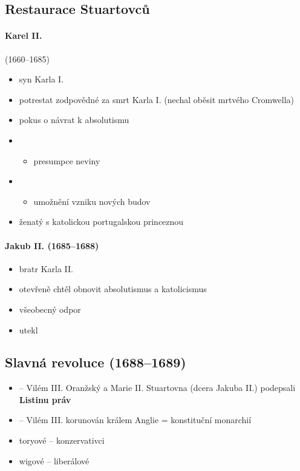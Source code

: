 \subsection{Restaurace Stuartovců}
\paragraph{Karel II.}(1660--1685)
\begin{itemize}
\item syn Karla I.
\item potrestat zodpovědné za smrt Karla I. (nechal oběsit mrtvého Cromwella)
\item pokus o návrat k absolutismu
\item {}
	\begin{itemize}
	\item presumpce neviny
	\end{itemize}
\item {}
	\begin{itemize}
	\item umožnění vzniku nových budov
	\end{itemize}
\item ženatý s katolickou portugalskou princeznou
\end{itemize}

\paragraph{Jakub II. (1685--1688)}
\begin{itemize}
\item bratr Karla II.
\item otevřeně chtěl obnovit absolutismus a katolicismus
\item[\ra] všeobecný odpor
\item utekl
\end{itemize}

\subsection{Slavná revoluce (1688--1689)}
\begin{itemize}
\item {} -- Vilém III. Oranžský a Marie II. Stuartovna (dcera Jakuba II.) podepsali \textbf{Listinu práv}
\item {} -- Vilém III. korunován králem \ra Anglie = konstituční monarchií
\item toryové -- konzervativci
\item wigové -- liberálové
\end{itemize}

